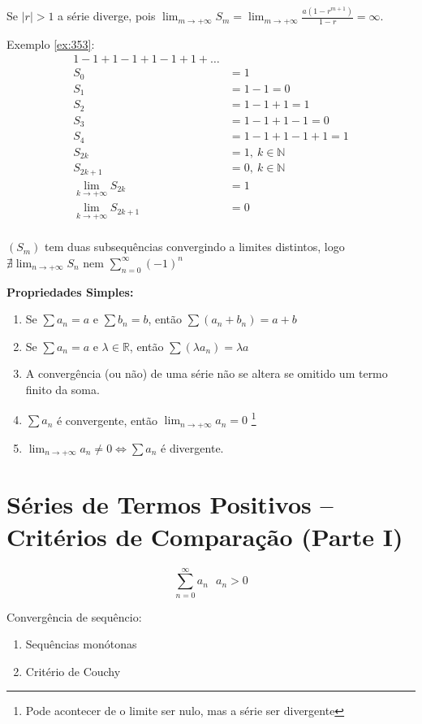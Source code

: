 \documentclass[12pt,openany]{book}
\begin{document}
Se $|r| > 1$ a série diverge, pois $\displaystyle{\lim_{m \rightarrow +\infty} S_m = \lim_{m \rightarrow +\infty} \frac{a(1-r^{m+1})}{1-r} = \infty}$.

Exemplo \ref{ex:353}: 
\begin{align*} 
1 - 1 + 1 - 1 + 1 - 1 + 1 + \hdots \\
S_0 &= 1 \\
S_1 &= 1 - 1 = 0 \\
S_2 &= 1 - 1 + 1 = 1 \\
S_3 &= 1 - 1 + 1  - 1 = 0 \\
S_4 &= 1 - 1 + 1  - 1 + 1 = 1 \\
S_{2k} &= 1, \ k \in \mathds{N} \\
S_{2k+1} &= 0, \ k \in \mathds{N} \\
\lim_{k \rightarrow +\infty} S_{2k} &= 1 \\
\lim_{k \rightarrow +\infty} S_{2k+1} &= 0 \\
\end{align*}

$(S_m)$  tem duas subsequências convergindo a limites distintos, logo $\nexists \displaystyle{\lim_{n \rightarrow +\infty} S_{n}}$ nem $\displaystyle{\sum_{n=0}^{\infty} (-1)^n}$

\textbf{Propriedades Simples:}
\begin{enumerate}
\item Se $\sum a_n = a$ e $\sum b_n = b$, então $\sum (a_n+b_n) = a+b$
\item Se $\sum a_n = a$ e $\lambda \in \mathds{R}$, então $\sum (\lambda a_n) = \lambda a$
\item A convergência (ou não) de uma série não se altera se omitido um termo finito da soma.
\item $\displaystyle{\sum a_n}$ é convergente, então $\displaystyle{\lim_{n \rightarrow +\infty} a_n = 0}$ \footnote{Pode acontecer de o limite ser nulo, mas a série ser divergente}
\item $\displaystyle{\lim_{n \rightarrow +\infty} a_n \neq 0 \Longleftrightarrow \sum a_n}$ é divergente.
\end{enumerate}

\section{Séries de Termos Positivos -- Critérios de Comparação (Parte I)}
\label{sec:s36}
$$\sum_{n=0}^{\infty} a_n \ \ \ a_n > 0 $$

Convergência de sequêncio:
\begin{enumerate}
\item Sequências monótonas \label{361}
\item Critério de Couchy \label{362}
\end{enumerate}
\end{document}
